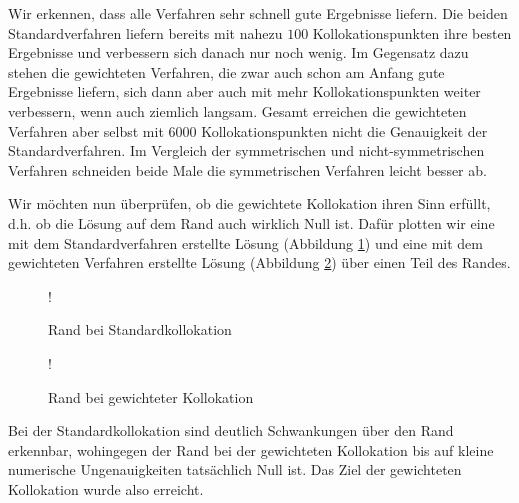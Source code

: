 Wir erkennen, dass alle Verfahren sehr schnell gute Ergebnisse liefern. Die beiden Standardverfahren liefern bereits mit nahezu $100$ Kollokationspunkten ihre besten Ergebnisse und verbessern sich danach nur noch wenig. Im Gegensatz dazu stehen die gewichteten Verfahren, die zwar auch schon am Anfang gute Ergebnisse liefern, sich dann aber auch mit mehr Kollokationspunkten weiter verbessern, wenn auch ziemlich langsam. Gesamt erreichen die gewichteten Verfahren aber selbst mit $6000$ Kollokationspunkten nicht die Genauigkeit der Standardverfahren. Im Vergleich der symmetrischen und nicht-symmetrischen Verfahren schneiden beide Male die symmetrischen Verfahren leicht besser ab.

Wir möchten nun überprüfen, ob die gewichtete Kollokation ihren Sinn erfüllt, d.h. ob die Lösung auf dem Rand auch wirklich Null ist. Dafür plotten wir eine mit dem Standardverfahren erstellte Lösung (Abbildung \ref{fig:rand standard}) und eine mit dem gewichteten Verfahren erstellte Lösung (Abbildung \ref{fig:rand weighted}) über einen Teil des Randes.

\begin{figure}[H]
\centering
\resizebox {.75\columnwidth} {!} {

}
\caption{Rand bei Standardkollokation}
\label{fig:rand standard}
\end{figure}
\begin{figure}[H]
\centering
\resizebox {.75\columnwidth} {!} {

}
\caption{Rand bei gewichteter Kollokation}
\label{fig:rand weighted}
\end{figure}

Bei der Standardkollokation sind deutlich Schwankungen über den Rand erkennbar, wohingegen der Rand bei der gewichteten Kollokation bis auf kleine numerische Ungenauigkeiten tatsächlich Null ist. Das Ziel der gewichteten Kollokation wurde also erreicht.
